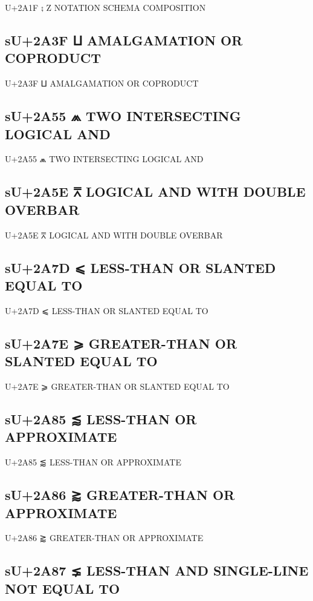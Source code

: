 U+2A1F ⨟ Z NOTATION SCHEMA COMPOSITION

\subsection{sU+2A3F ⨿ AMALGAMATION OR COPRODUCT}

U+2A3F ⨿ AMALGAMATION OR COPRODUCT

\subsection{sU+2A55 ⩕ TWO INTERSECTING LOGICAL AND}

U+2A55 ⩕ TWO INTERSECTING LOGICAL AND

\subsection{sU+2A5E ⩞ LOGICAL AND WITH DOUBLE OVERBAR}

U+2A5E ⩞ LOGICAL AND WITH DOUBLE OVERBAR

\subsection{sU+2A7D ⩽ LESS-THAN OR SLANTED EQUAL TO}

U+2A7D ⩽ LESS-THAN OR SLANTED EQUAL TO

\subsection{sU+2A7E ⩾ GREATER-THAN OR SLANTED EQUAL TO}

U+2A7E ⩾ GREATER-THAN OR SLANTED EQUAL TO

\subsection{sU+2A85 ⪅ LESS-THAN OR APPROXIMATE}

U+2A85 ⪅ LESS-THAN OR APPROXIMATE

\subsection{sU+2A86 ⪆ GREATER-THAN OR APPROXIMATE}

U+2A86 ⪆ GREATER-THAN OR APPROXIMATE

\subsection{sU+2A87 ⪇ LESS-THAN AND SINGLE-LINE NOT EQUAL TO}

